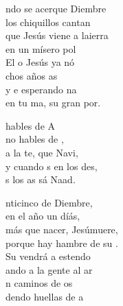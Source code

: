 \begin{cancion}%
	ndo se acerque Diembre\\
	los chiquillos cantan\\
	que Jesús viene a laierra\\
	en un mísero pol \\
	El o Jesús ya nó\\
	chos años as\\
	y e esperando na \\
	en tu ma, su gran por.\jump\\
	\begin{chorus}%
		hables de A \\
		no hables de ,\\
		a la te, que  Navi,\\
		y cuando s en los des,\\
		s los as sá Naad.\jump\\
	\end{chorus}%
	nticinco de Diembre,\\
	en el año un díás,\\
	más que nacer, Jesúmuere,\\
	porque hay hambre de su . \\
	Su vendrá a estendo\\
	ando a la gente al ar  \\
	n caminos de os\\
	dendo huellas de a \\
\end{cancion}%
